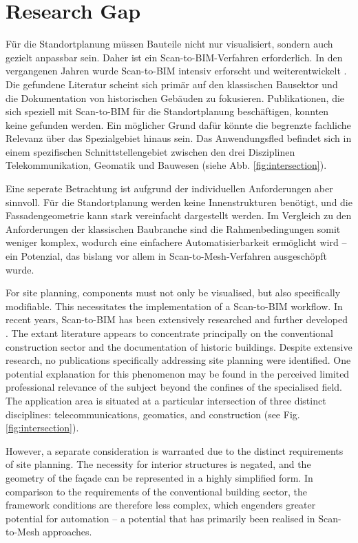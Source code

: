\section{Research Gap}
\label{sec:research_gap}
\begin{German}
    Für die Standortplanung müssen Bauteile nicht nur visualisiert, sondern auch gezielt anpassbar sein. Daher ist ein Scan-to-BIM-Verfahren erforderlich. In den vergangenen Jahren wurde Scan-to-BIM intensiv erforscht und weiterentwickelt \cite{rochaSurveyScantoBIMPractices2021}. Die gefundene Literatur scheint sich primär auf den klassischen Bausektor und die Dokumentation von historischen Gebäuden zu fokusieren. Publikationen, die sich speziell mit Scan-to-BIM für die Standortplanung beschäftigen, konnten keine gefunden werden. Ein möglicher Grund dafür könnte die begrenzte fachliche Relevanz über das Spezialgebiet hinaus sein. Das Anwendungsfled befindet sich in einem spezifischen Schnittstellengebiet zwischen den drei Disziplinen Telekommunikation, Geomatik und Bauwesen (siehe Abb. \ref{fig:intersection}).    
    
    Eine seperate Betrachtung ist aufgrund der individuellen Anforderungen aber sinnvoll. Für die Standortplanung werden keine Innenstrukturen benötigt, und die Fassadengeometrie kann stark vereinfacht dargestellt werden. Im Vergleich zu den Anforderungen der klassischen Baubranche sind die Rahmenbedingungen somit weniger komplex, wodurch eine einfachere Automatisierbarkeit ermöglicht wird -- ein Potenzial, das bislang vor allem in Scan-to-Mesh-Verfahren ausgeschöpft wurde.

    
\end{German}
\begin{English}
    For site planning, components must not only be visualised, but also specifically modifiable. This necessitates the implementation of a Scan-to-BIM workflow. In recent years, Scan-to-BIM has been extensively researched and further developed \cite{rochaSurveyScantoBIMPractices2021}. The extant literature appears to concentrate principally on the conventional construction sector and the documentation of historic buildings. Despite extensive research, no publications specifically addressing site planning were identified. One potential explanation for this phenomenon may be found in the perceived limited professional relevance of the subject beyond the confines of the specialised field. The application area is situated at a particular intersection of three distinct disciplines: telecommunications, geomatics, and construction (see Fig. \ref{fig:intersection}).

    However, a separate consideration is warranted due to the distinct requirements of site planning. The necessity for interior structures is negated, and the geometry of the façade can be represented in a highly simplified form. In comparison to the requirements of the conventional building sector, the framework conditions are therefore less complex, which engenders greater potential for automation -- a potential that has primarily been realised in Scan-to-Mesh approaches.
\end{English}

